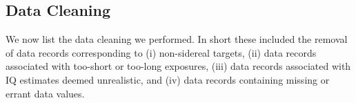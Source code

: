 

\subsection{Data Cleaning}
\label{sec:data_cleaning}
We now list the data cleaning we performed.  In short these included the removal of data records corresponding to (i) non-sidereal targets, (ii) data records associated with too-short or too-long exposures, (iii) data records associated with IQ estimates deemed unrealistic, and (iv) data records containing missing or errant data values. 



